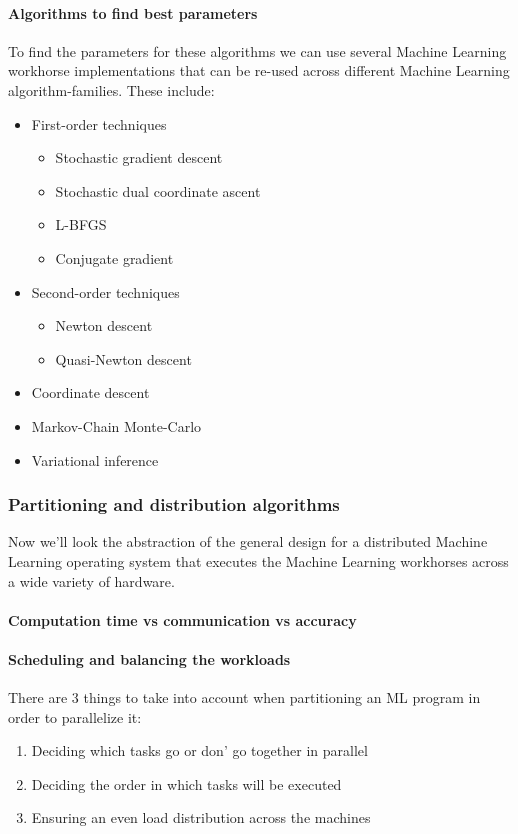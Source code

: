 \paragraph{Algorithms to find best parameters}
To find the parameters for these algorithms we can use several Machine Learning workhorse implementations that can be re-used across different Machine Learning algorithm-families. These include:
\begin{itemize}
	\item First-order techniques
	\begin{itemize}
		\item Stochastic gradient descent
		\item Stochastic dual coordinate ascent\cite{Shal13}
		\item L-BFGS
		\item Conjugate gradient
	\end{itemize}
	\item Second-order techniques
	\begin{itemize}
		\item Newton descent
		\item Quasi-Newton descent
	\end{itemize}
	\item Coordinate descent
	\item Markov-Chain Monte-Carlo
	\item Variational inference
\end{itemize}




\subsubsection{Partitioning and distribution algorithms}
Now we'll look the abstraction of the general design for a distributed Machine Learning operating system that executes the Machine Learning workhorses across a wide variety of hardware.


\paragraph{Computation time vs communication vs accuracy}


\paragraph{Scheduling and balancing the workloads}
There are 3 things to take into account when partitioning an ML program in order to parallelize it:\cite{Xing16}\\
\begin{enumerate}
	\item Deciding which tasks go or don' go together in parallel
	\item Deciding the order in which tasks will be executed
	\item Ensuring an even load distribution across the machines
\end{enumerate}



